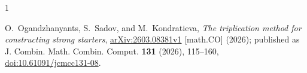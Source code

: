 \documentclass[11pt]{amsart}
\theoremstyle{remark}
\begin{document}
\begin{thebibliography}{1}

O.~Ogandzhanyants, S.~Sadov, and M.~Kondratieva,
\emph{The triplication method for constructing strong starters},
\href{https://arxiv.org/abs/2603.08381v1}{arXiv:2603.08381v1}
[math.CO] (2026); published as
J. Combin. Math. Combin. Comput. \textbf{131} (2026), 115--160,
\href{https://doi.org/10.61091/jcmcc131-08}
{doi:10.61091/jcmcc131-08}.

\end{thebibliography}
\end{document}
